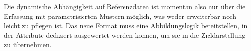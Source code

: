 Die dynamische Abhängigkeit auf Referenzdaten ist momentan also nur über die Erfassung mit parametrisierten Mustern möglich, was weder erweiterbar noch leicht zu pflegen ist.
Das neue Format muss eine Abbildungslogik bereitstellen, in der Attribute dediziert ausgewertet werden können, um sie in die Zieldarstellung zu übernehmen.
